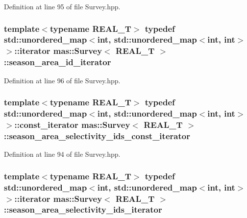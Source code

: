 Definition at line 95 of file Survey.\-hpp.

\hypertarget{structmas_1_1_survey_aabb40313de7f308ef66d028b839984ca}{
\subsubsection[{season\-\_\-area\-\_\-id\-\_\-iterator}]{\setlength{\rightskip}{0pt plus 5cm}template$<$typename R\-E\-A\-L\-\_\-\-T$>$ typedef std\-::unordered\-\_\-map$<$int, std\-::unordered\-\_\-map$<$int, int$>$ $>$\-::iterator {\bf mas\-::\-Survey}$<$ R\-E\-A\-L\-\_\-\-T $>$\-::{\bf season\-\_\-area\-\_\-id\-\_\-iterator}}}\label{structmas_1_1_survey_aabb40313de7f308ef66d028b839984ca}


Definition at line 96 of file Survey.\-hpp.

\hypertarget{structmas_1_1_survey_af8b1532c87b7b6cce73d17472d03eb5a}{
\subsubsection[{season\-\_\-area\-\_\-selectivity\-\_\-ids\-\_\-const\-\_\-iterator}]{\setlength{\rightskip}{0pt plus 5cm}template$<$typename R\-E\-A\-L\-\_\-\-T$>$ typedef std\-::unordered\-\_\-map$<$int, std\-::unordered\-\_\-map$<$int, int$>$ $>$\-::const\-\_\-iterator {\bf mas\-::\-Survey}$<$ R\-E\-A\-L\-\_\-\-T $>$\-::{\bf season\-\_\-area\-\_\-selectivity\-\_\-ids\-\_\-const\-\_\-iterator}}}\label{structmas_1_1_survey_af8b1532c87b7b6cce73d17472d03eb5a}


Definition at line 94 of file Survey.\-hpp.

\hypertarget{structmas_1_1_survey_a93b422e50a88d61d2bf59e5cf8895295}{
\subsubsection[{season\-\_\-area\-\_\-selectivity\-\_\-ids\-\_\-iterator}]{\setlength{\rightskip}{0pt plus 5cm}template$<$typename R\-E\-A\-L\-\_\-\-T$>$ typedef std\-::unordered\-\_\-map$<$int, std\-::unordered\-\_\-map$<$int, int$>$ $>$\-::iterator {\bf mas\-::\-Survey}$<$ R\-E\-A\-L\-\_\-\-T $>$\-::{\bf season\-\_\-area\-\_\-selectivity\-\_\-ids\-\_\-iterator}}}\label{structmas_1_1_survey_a93b422e50a88d61d2bf59e5cf8895295}


